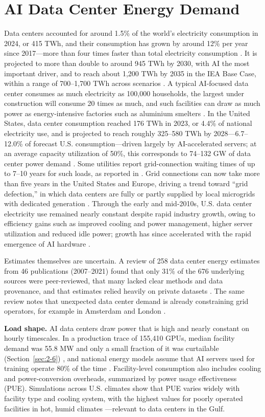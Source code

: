 \section{AI Data Center Energy Demand}\label{sec:2-3}

Data centers accounted for around 1.5\% of the world's electricity consumption in 2024, or 415 TWh, and their consumption has grown by around 12\% per year since 2017---more than four times faster than total electricity consumption \cite{r40}. It is projected to more than double to around 945 TWh by 2030, with AI the most important driver, and to reach about 1,200 TWh by 2035 in the IEA Base Case, within a range of 700--1,700 TWh across scenarios \cite{r40}. A typical AI-focused data center consumes as much electricity as 100,000 households, the largest under construction will consume 20 times as much, and such facilities can draw as much power as energy-intensive factories such as aluminium smelters \cite{r40}. In the United States, data center consumption reached 176 TWh in 2023, or 4.4\% of national electricity use, and is projected to reach roughly 325--580 TWh by 2028---6.7--12.0\% of forecast U.S. consumption---driven largely by AI-accelerated servers; at an average capacity utilization of 50\%, this corresponds to 74--132 GW of data center power demand \cite{r1}. Some utilities report grid-connection waiting times of up to 7--10 years for such loads, as reported in \cite{r8}. Grid connections can now take more than five years in the United States and Europe, driving a trend toward ``grid defection,'' in which data centers are fully or partly supplied by local microgrids with dedicated generation \cite{r28}. Through the early and mid-2010s, U.S. data center electricity use remained nearly constant despite rapid industry growth, owing to efficiency gains such as improved cooling and power management, higher server utilization and reduced idle power; growth has since accelerated with the rapid emergence of AI hardware \cite{r1}.

Estimates themselves are uncertain. A review of 258 data center energy estimates from 46 publications (2007--2021) found that only 31\% of the 676 underlying sources were peer-reviewed, that many lacked clear methods and data provenance, and that estimates relied heavily on private datasets \cite{r29}. The same review notes that unexpected data center demand is already constraining grid operators, for example in Amsterdam and London \cite{r29}.

\textbf{Load shape.} AI data centers draw power that is high and nearly constant on hourly timescales. In a production trace of 155,410 GPUs, median facility demand was 55.8 MW and only a small fraction of it was curtailable (Section~\ref{sec:2-6}) \cite{r26}, and national energy models assume that AI servers used for training operate 80\% of the time \cite{r1}. Facility-level consumption also includes cooling and power-conversion overheads, summarized by power usage effectiveness (PUE). Simulations across U.S. climates show that PUE varies widely with facility type and cooling system, with the highest values for poorly operated facilities in hot, humid climates \cite{r1}---relevant to data centers in the Gulf.


